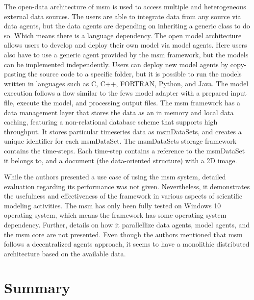 The open-data architecture of \acrshort{msm} is used to access multiple and heterogeneous external data sources. The users are able to integrate data from any source via data agents, but the data agents are depending on inheriting a generic class to do so. Which means there is a language dependency. The open model architecture allows users to develop and deploy their own model via model agents. Here users also have to use a generic agent provided by the \acrshort{msm} framework, but the models can be implemented independently. Users can deploy new model agents by copy-pasting the source code to a specific folder, but it is possible to run the models written in languages such as C, C++, FORTRAN, Python, and Java. The model execution follows a flow similar to the \acrshort{fews} model adapter with a prepared input file, execute the model, and processing output files. The \acrshort{msm} framework has a data management layer that stores the data as an in memory and local data caching, featuring a non-relational database scheme that supports high throughput. It stores particular timeseries data as msmDataSets, and creates a unique identifier for each msmDataSet. The msmDataSets storage framework contains the time-steps. Each time-step contains a reference to the msmDataSet it belongs to, and a document (the data-oriented structure) with a 2D image.

While the authors presented a use case of using the \acrshort{msm} system, detailed evaluation regarding its performance was not given. Nevertheless, it demonstrates the usefulness and effectiveness of the framework in various aspects of scientific modeling activities. The \acrshort{msm} has only been fully tested on Windows 10 operating system, which means the framework has some operating system dependency. Further, details on how it parallellize data agents, model agents, and the \acrshort{msm} core are not presented. Even though the authors mentioned that \acrshort{msm} follows a decentralized agents approach, it seems to have a monolithic distributed architecture based on the available data. 


\section{Summary}
\label{se:lit_summary}

